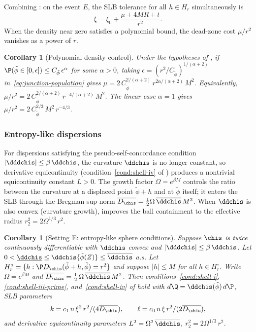\documentclass{article}
\newtheorem{corollary}[theorem]{Corollary}
\newcommand{\theoremvariant}[1]{%
  \setcounter{theorem}{\numexpr\variantbase-1\relax}%
  \renewcommand{\thetheorem}{\thesection.\variantbase\textup{#1}}%
}
\newcommand{\resettheorem}{%
  \renewcommand{\thetheorem}{\thesection.\arabic{theorem}}%
}
\begin{document}
Combining :
on the event $E$,
the SLB tolerance for all $h \in H_r$ simultaneously is
\begin{equation}\label{eq:two-pile-tolerance}
\xi = \xi_0
  + \frac{\mu + 4MR + t}{r^2}.
\end{equation}
When the density near zero satisfies
a polynomial bound,
the dead-zone cost $\mu/r^2$
vanishes as a power of $r$.

\begin{corollary}[Polynomial density control]\label{cor:two-pile-polynomial}
Under the hypotheses of
,
if $\P(\tilde\phi \in [0,\epsilon])
  \le C_{\tilde\phi}\, \epsilon^\alpha$
for some $\alpha > 0$,
taking $\epsilon = (r^2/C_{\tilde\phi})^{1/(\alpha+2)}$
in~\eqref{eq:junction-population} gives
$\mu
  = 2\, C_{\tilde\phi}^{2/(\alpha+2)}\,
    r^{2\alpha/(\alpha+2)}\, M^2$.
Equivalently,
$\mu/r^2 = 2\, C_{\tilde\phi}^{2/(\alpha+2)}\,
  r^{-4/(\alpha+2)}\, M^2$.
The linear case $\alpha = 1$ gives
$\mu/r^2 = 2\, C_{\tilde\phi}^{2/3}\, M^2\, r^{-4/3}$.
\end{corollary}

\subsubsection{Entropy-like dispersions}

For dispersions satisfying
the pseudo-self-concordance condition
$|\dddchis| \le \beta\,\ddchis$,
the curvature $\ddchis$ is no longer constant,
so derivative equicontinuity (condition~\ref{cond:shell-iv} of )
produces a nontrivial equicontinuity constant $L > 0$.
The growth factor $\Omega = e^{\beta M}$
controls the ratio between the curvature
at a displaced point $\tilde\phi + h$
and at $\tilde\phi$ itself;
it enters the SLB through the Bregman sup-norm
$\overline{D_{\chis}} = \frac{1}{2}\Omega\,\overline{\ddchis}\,M^2$.
When $\ddchis$ is also convex (curvature growth),
 improves the
ball containment to the effective radius
$r_2^2 = 2\Omega^{1/3}\,r^2$.

\theoremvariant{E}
\begin{corollary}[Setting E: entropy-like sphere conditions]
\label{cor:ulb-entropy}
Suppose $\chis$ is twice continuously differentiable
with $\ddchis$ convex
and $|\dddchis| \le \beta\,\ddchis$.
Let $0 < \underline{\ddchis}
  \le \ddchis\{\tilde\phi(Z)\}
  \le \overline{\ddchis}$ a.s.
Let $H_r^\circ = \{h : \P D_{\chis}(\tilde\phi+h,\tilde\phi) = r^2\}$
and suppose $|h| \le M$ for all $h \in H_r^\circ$.
Write $\Omega = e^{\beta M}$
and $\overline{D_{\chis}}
  = \tfrac{1}{2}\,\Omega\,\overline{\ddchis}\,M^2$.
Then conditions~\ref{cond:shell-i}, \ref{cond:shell-iii-prime},
and~\ref{cond:shell-iv} of 
hold with $d\Q = \ddchis(\tilde\phi)\,d\P$,
SLB parameters
\[
k = c_1\, n\, \xi^2\, r^2 / (4\overline{D_{\chis}}),
\qquad
\ell = c_0\, n\, \xi\, r^2 / (2\overline{D_{\chis}}),
\]
and derivative equicontinuity parameters
$L^2 = \Omega^2\,\overline{\ddchis}$,
$r_2^2 = 2\Omega^{1/3}\,r^2$.
\end{corollary}
\resettheorem
\end{document}
